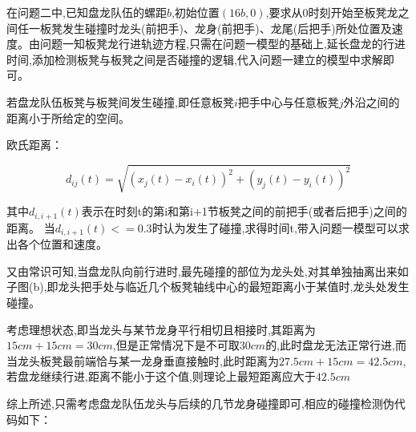 
在问题二中,已知盘龙队伍的螺距$b$,初始位置$(16b,0)$,要求从$0$时刻开始至板凳龙之间任一板凳发生碰撞时龙头(前把手)、龙身(前把手)、龙尾(后把手)所处位置及速度。由问题一知板凳龙行进轨迹方程,只需在问题一模型的基础上,延长盘龙的行进时间,添加检测板凳与板凳之间是否碰撞的逻辑,代入问题一建立的模型中求解即可。


若盘龙队伍板凳与板凳间发生碰撞,即任意板凳$i$把手中心与任意板凳$j$外沿之间的距离小于所给定的空间。

欧氏距离：

\begin{equation}
	d_{ij}(t)=\sqrt{(x_j(t)-x_i(t))^2+(y_j(t)-y_i(t))^2}
\end{equation}

其中$d_{i,i+1}(t)$表示在时刻t的第i和第i+1节板凳之间的前把手(或者后把手)之间的距离。
当$d_{i,i+1}(t)<=0.3$时认为发生了碰撞,求得时间t,带入问题一模型可以求出各个位置和速度。




又由常识可知,当盘龙队向前行进时,最先碰撞的部位为龙头处,对其单独抽离出来如子图(b),即龙头把手处与临近几个板凳轴线中心的最短距离小于某值时,龙头处发生碰撞。

考虑理想状态,即当龙头与某节龙身平行相切且相接时,其距离为$15cm + 15cm = 30cm$,但是正常情况下是不可取$30cm$的,此时盘龙无法正常行进,而当龙头板凳最前端恰与某一龙身垂直接触时,此时距离为$27.5cm + 15cm = 42.5cm$,若盘龙继续行进,距离不能小于这个值,则理论上最短距离应大于$42.5cm$

综上所述,只需考虑盘龙队伍龙头与后续的几节龙身碰撞即可,相应的碰撞检测伪代码如下：

